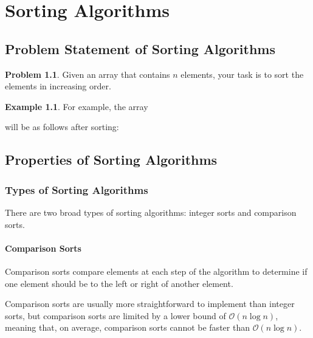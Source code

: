 \documentclass[twoside,12pt,a4paper,english]{book}
\theoremstyle{definition}
\newtheorem*{exmp}{Example}
\theoremstyle{problemstyle}
\newtheorem*{problem}{Problem} %
\begin{document}
\chapter{Sorting Algorithms}
\section{Problem Statement of Sorting Algorithms}
\begin{problem}
Given an array that contains $n$ elements, your task is to sort the elements in
increasing order.
\end{problem}
\begin{exmp}
For example, the array
\begin{center}
\end{center}
will be as follows after sorting:
\begin{center}
\end{center}
\end{exmp}
\section{Properties of Sorting Algorithms}
\subsection{Types of Sorting Algorithms}
There are two broad types of sorting algorithms: integer sorts and comparison sorts.
\subsubsection{Comparison Sorts}
Comparison sorts compare elements at each step of the algorithm to determine if one element should be to the left or right of another element.

Comparison sorts are usually more straightforward to implement than integer sorts, but comparison sorts are limited by a lower bound of $\mathcal{O}(n\log{n})$, meaning that, on average, comparison sorts cannot be faster than $\mathcal{O}(n\log{n})$.
\end{document}
